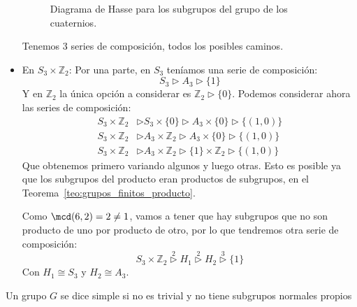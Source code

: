 \begin{ejemplo}
\begin{itemize}
\begin{figure}[H]
                \caption{Diagrama de Hasse para los subgrupos del grupo de los cuaternios.}
            \end{figure}
            Tenemos 3 series de composición, todos los posibles caminos.
        \item En $S_3\times \mathbb{Z}_2$:
            Por una parte, en $S_3$ teníamos una serie de composición:
            \begin{equation*}
                S_3 \rhd A_3 \rhd \{1\}
            \end{equation*}
            Y en $\mathbb{Z}_2$ la única opción a considerar es $\mathbb{Z}_2 \rhd \{0\}$.
            Podemos considerar ahora las series de composición:
            \begin{align*}
                S_3\times \mathbb{Z}_2 &\rhd S_3 \times \{0\} \rhd A_3\times \{0\} \rhd \{(1,0)\} \\
                S_3\times \mathbb{Z}_2 &\rhd A_3\times \mathbb{Z}_2 \rhd A_3 \times \{0\} \rhd \{(1,0)\} \\
                S_3\times \mathbb{Z}_2 &\rhd A_3\times \mathbb{Z}_2 \rhd \{1\}\times \mathbb{Z}_2 \rhd \{(1,0)\}
            \end{align*}
            Que obtenemos primero variando algunos y luego otras. Esto es posible ya que los subgrupos del producto eran productos de subgrupos, en el Teorema~\ref{teo:grupos_finitos_producto}.

            Como $\mcd(6,2) = 2 \neq 1$, vamos a tener que hay subgrupos que no son producto de uno por producto de otro, por lo que tendremos otra serie de composición:
            \begin{equation*}
                S_3\times \mathbb{Z}_2 \stackrel{2}{\rhd} H_1 \stackrel{2}{\rhd} H_2 \stackrel{3}{\rhd} \{1\}
            \end{equation*}
            Con $H_1\cong S_3$ y $H_2 \cong A_3$.
    \end{itemize}
\end{ejemplo}

\begin{definicion}
    Un grupo $G$ se dice simple si no es trivial y no tiene subgrupos normales propios
\end{definicion}

